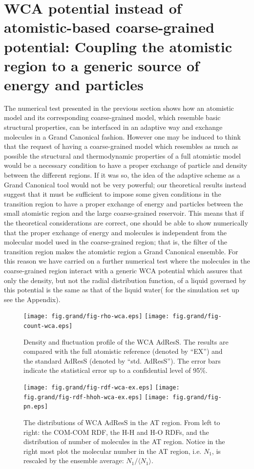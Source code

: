 \documentclass[aip,jcp,a4paper,reprint,onecolumn]{revtex4-1}
\begin{document}
\section{WCA potential instead of atomistic-based coarse-grained potential: Coupling the atomistic region to a generic source of energy and particles}
The numerical test presented in the previous section shows how an atomistic model and its corresponding coarse-grained model, which resemble basic structural properties, can be interfaced in an adaptive way and exchange molecules in a Grand Canonical fashion. However one may be induced to think that the request of having a coarse-grained model which resembles as much as possible the structural and thermodynamic properties of a full atomistic model would be a necessary condition to have a proper exchange of particle and density between the different regions. If it was so, the idea of the adaptive scheme as a Grand Canonical tool would not be very powerful; our theoretical results instead suggest that it must be sufficient to impose some given conditions in the transition region to have a proper exchange of energy and particles between the small atomistic region and the large coarse-grained reservoir. 
This means that if the theoretical considerations are correct, one should be able to show numerically that the proper exchange of energy and molecules is independent from the molecular model used in the coarse-grained region; that is, the filter of the transition region makes the atomistic region a Grand Canonical ensemble. For this reason we have carried on a further numerical test where the molecules in the coarse-grained region interact with a generic WCA potential which assures that only the density, but not the radial distribution function, of a liquid governed by this potential is the same as that of the liquid water( for the simulation set up see the Appendix).
\begin{figure}
  \centering
  \texttt{[image: fig.grand/fig-rho-wca.eps]}
  \texttt{[image: fig.grand/fig-count-wca.eps]}
  \caption{Density and fluctuation profile of the WCA AdResS.  The
    results are compared with the full atomistic reference (denoted by
    ``EX'') and the  standard AdResS (denoted by ``std. AdResS'').
    The error bars indicate the statistical error up to a confidential
    level of 95\%.
  }
  \label{fig:wca-den}
\end{figure}

\begin{figure}
  \centering
  \texttt{[image: fig.grand/fig-rdf-wca-ex.eps]}
  \texttt{[image: fig.grand/fig-rdf-hhoh-wca-ex.eps]}
  \texttt{[image: fig.grand/fig-pn.eps]}
  \caption{
    The distributions of WCA AdResS in the AT region.
    From left to right: the COM-COM RDF, the H-H and H-O RDFs, and
    the distribution of number of molecules in the AT region.
    Notice in the right most plot the molecular number in the AT region,
    i.e. $N_1$, is rescaled by the ensemble average: $N_1 / \langle N_1\rangle$.
  }
  \label{fig:wca-dist}
\end{figure}
\end{document}
